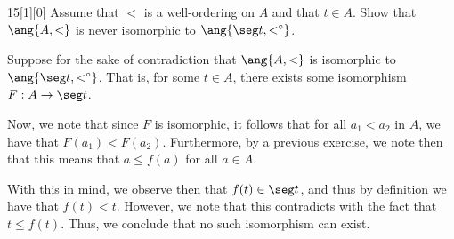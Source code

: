 \documentclass{article}
\begin{document}
\begin{hw}{15}[1][0]
	Assume that $<$ is a well-ordering on $A$ and that $t \in A$. Show that $\ang{A, <}$ is never isomorphic to $\ang{\seg t, <^{\circ}}$.
\end{hw}
\begin{solution}
	Suppose for the sake of contradiction that $\ang{A, <}$ is isomorphic to $\ang{\seg t, <^{\circ}}$. That is, for some $t \in A$, there exists some isomorphism $F : A \rightarrow \seg t$.
	
	Now, we note that since $F$ is isomorphic, it follows that for all $a_1 < a_2$ in $A$, we have that $F(a_1) < F(a_2)$. Furthermore, by a previous exercise, we note then that this means that $a \leq f(a)$ for all $a \in A$.
	
	With this in mind, we observe then that $f(t) \in \seg t$, and thus by definition we have that $f(t) < t$. However, we note that this contradicts with the fact that $t \leq f(t)$. Thus, we conclude that no such isomorphism can exist.
\end{solution}
\end{document}
